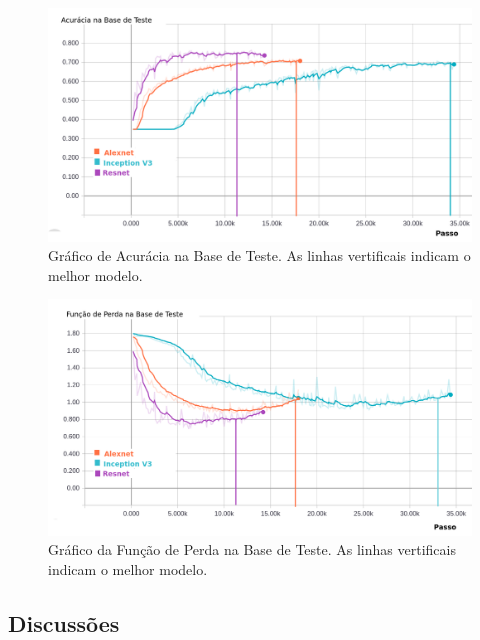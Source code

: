 \begin{figure}
\centering
\includegraphics[scale=0.5]{figuras/accuracy_val.png}
\caption{Gráfico de Acurácia na Base de Teste. As linhas vertificais indicam o melhor modelo.}
\label{fig:acc-val}
\end{figure}


\begin{figure}
\centering
\includegraphics[scale=0.5]{figuras/loss-val.png}
\caption{Gráfico da Função de Perda na Base de Teste. As linhas vertificais indicam o melhor modelo.}
\label{fig:loss-val}
\end{figure}


\subsection{Discussões}




